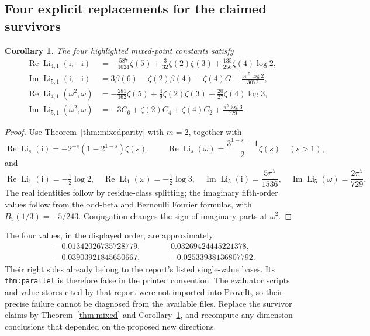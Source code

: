 \documentclass[11pt]{article}
\newtheorem{corollary}[theorem]{Corollary}
\theoremstyle{definition}
\theoremstyle{remark}
\newcommand{\Li}{\operatorname{Li}}
\newcommand{\ii}{\mathrm{i}}
\newcommand{\Repart}{\operatorname{Re}}
\newcommand{\Impart}{\operatorname{Im}}
\newcommand{\src}[1]{\texttt{\small #1}}
\begin{document}
\subsection{Four explicit replacements for the claimed survivors}

\begin{corollary}\label{cor:four}
The four highlighted mixed-point constants satisfy
\begin{align}
\Repart\Li_{4,1}(\ii,-\ii)
&=-\frac{587}{1024}\zeta(5)
 +\frac3{32}\zeta(2)\zeta(3)
 +\frac{135}{256}\zeta(4)\log2,
\label{eq:gaussian4}\\
\Impart\Li_{5,1}(\ii,-\ii)
&=3\beta(6)-\zeta(2)\beta(4)-\zeta(4)G
 -\frac{5\pi^5\log2}{3072},
\label{eq:gaussian5}\\
\Repart\Li_{4,1}(\omega^2,\omega)
&=-\frac{281}{162}\zeta(5)
 +\frac49\zeta(2)\zeta(3)
 +\frac{20}{27}\zeta(4)\log3,
\label{eq:eisenstein4}\\
\Impart\Li_{5,1}(\omega^2,\omega)
&=-3C_6+\zeta(2)C_4+\zeta(4)C_2
 +\frac{\pi^5\log3}{729}.
\label{eq:eisenstein5}
\end{align}
\end{corollary}
\begin{proof}
Use Theorem~\ref{thm:mixedparity} with \(m=2\), together with
\[
\Repart\Li_s(\ii)=-2^{-s}(1-2^{1-s})\zeta(s),\qquad
\Repart\Li_s(\omega)=\frac{3^{1-s}-1}{2}\zeta(s)\quad(s>1),
\]
and
\[
\Repart\Li_1(\ii)=-\tfrac12\log2,\quad
\Repart\Li_1(\omega)=-\tfrac12\log3,\quad
\Impart\Li_5(\ii)=\frac{5\pi^5}{1536},\quad
\Impart\Li_5(\omega)=\frac{2\pi^5}{729}.
\]
The real identities follow by residue-class splitting; the imaginary
fifth-order values follow from the odd-beta and Bernoulli Fourier
formulas, with \(B_5(1/3)=-5/243\).
Conjugation changes the sign of imaginary parts at \(\omega^2\).
\end{proof}

The four values, in the displayed order, are approximately
\[
\begin{aligned}
&-0.01342026735728779,\qquad && 0.03269424445221378,\\
&-0.03903921845650667,\qquad &&-0.02533938136807792.
\end{aligned}
\]
Their right sides already belong to the report's listed single-value
bases. Its \src{thm:parallel} is therefore false in the printed
convention. The evaluator scripts and value stores cited by that report
were not imported into ProveIt, so their precise failure cannot be
diagnosed from the available files. Replace the survivor claims by
Theorem~\ref{thm:mixed} and Corollary~\ref{cor:four}, and recompute any
dimension conclusions that depended on the proposed new directions.








\clearpage
{}
{}

\end{document}
